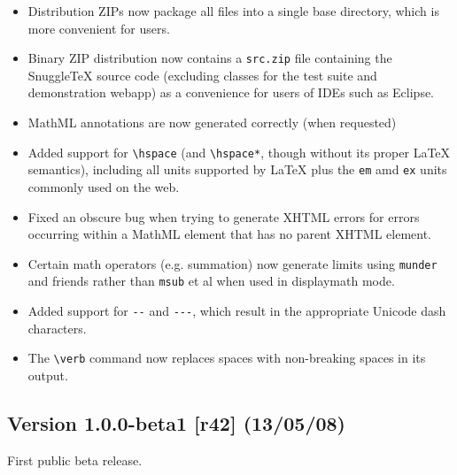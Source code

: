 \begin{itemize}

  \item Distribution ZIPs now package all files into a single base directory,
  which is more convenient for users.

  \item Binary ZIP distribution now contains a \verb|src.zip| file containing
  the SnuggleTeX source code (excluding classes for the test suite and
  demonstration webapp) as a convenience for users of IDEs such as Eclipse.

  \item MathML annotations are now generated correctly (when requested)

  \item Added support for \verb|\hspace| (and \verb|\hspace*|, though without
  its proper LaTeX semantics), including all units supported by LaTeX plus the
  \verb|em| amd \verb|ex| units commonly used on the web.

  \item Fixed an obscure bug when trying to generate XHTML errors for errors
  occurring within a MathML element that has no parent XHTML element.

  \item Certain math operators (e.g. summation) now generate limits using
  \verb|munder| and friends rather than \verb|msub| et al when used in
  displaymath mode.

  \item Added support for \verb|--| and \verb|---|, which result in the
  appropriate Unicode dash characters.

  \item The \verb|\verb| command now replaces spaces with non-breaking spaces
  in its output.

\end{itemize}

\subsection*{Version 1.0.0-beta1 [r42] (13/05/08)}

First public beta release.
